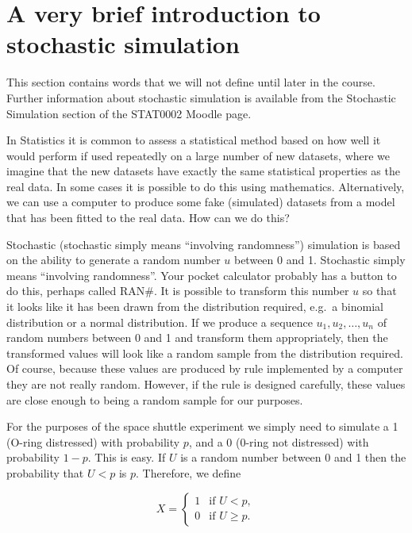 \documentclass[
  11pt,
  british,
  openany, a4paper]{book}
\begin{document}
\hypertarget{a-very-brief-introduction-to-stochastic-simulation}{%
\section{A very brief introduction to stochastic simulation}\label{a-very-brief-introduction-to-stochastic-simulation}}

This section contains words that we will not define until later in the course. Further information about stochastic simulation is available from the Stochastic Simulation section of the STAT0002 Moodle page.

In Statistics it is common to assess a statistical method based on how well it would perform if used repeatedly on a large number of new datasets, where we imagine that the new datasets have exactly the same statistical properties as the real data. In some cases it is possible to do this using mathematics. Alternatively, we can use a computer to produce some fake (simulated) datasets from a model that has been fitted to the real data. How can we do this?

Stochastic (stochastic simply means ``involving randomness'') simulation is based on the ability to generate a random number \(u\) between 0 and 1. Stochastic simply means ``involving randomness''. Your pocket calculator probably has a button to do this, perhaps called RAN\#. It is possible to transform this number \(u\) so that it looks like it has been drawn from the distribution required, e.g.~a binomial distribution or a normal distribution. If we produce a sequence \(u_1, u_2, \ldots, u_n\) of random numbers between 0 and 1 and transform them appropriately, then the transformed values will look like a random sample from the distribution required. Of course, because these values are produced by rule implemented by a computer they are not really random. However, if the rule is designed carefully, these values are close enough to being a random sample for our purposes.

For the purposes of the space shuttle experiment we simply need to simulate a 1 (O-ring distressed) with probability \(p\), and a 0 (0-ring not distressed) with probability \(1-p\). This is easy. If \(U\) is a random number between 0 and 1 then the probability that \(U < p\) is \(p\). Therefore, we define

\begin{equation}
X = 
\begin{cases} 
1 & \text{if } U < p, \\
0 & \text{if } U \geq p.
\end{cases}
\label{eq:xbin}
\end{equation}
\end{document}

